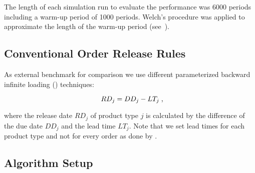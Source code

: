 \documentclass[envcountsame]{llncs}
\newcommand\MS[2][r]{\ifx t#1 \textcolor{blue}{[\textbf{MS:} #2]}
  \else \begin{center}\textcolor{blue}{\textbf{MS:} #2} \end{center} \fi}
\begin{document}
The length of each simulation run to evaluate the performance was 6000 periods including a warm-up
period of 1000 periods. Welch’s procedure was applied to approximate the length of the warm-up
period (see~\citealt{law:simulationc}).



\subsection{Conventional Order Release Rules}

As external benchmark for comparison we use
different parameterized backward infinite loading (\BIL{}) techniques:

\begin{equation*}
  RD_{j} = DD_{j} - LT_{j} \tcom
  \label{eq:BIL}
\end{equation*}

where the release date \(RD_{j}\) of product type \(j\) is calculated by the difference of the due
date \(DD_{j}\) and the lead time \(LT_{j}\). Note that we set lead times for each product type and
not for every order as done by \cite{Ackerman1963}.




\subsection{Algorithm Setup}
\label{subsec:Algorithm_Setup}
\end{document}

